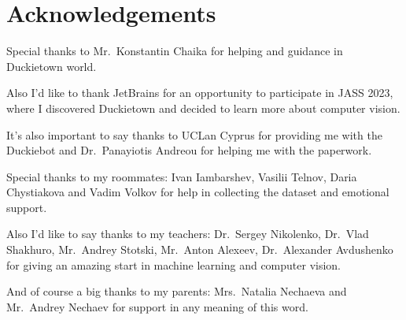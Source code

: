 \section*{Acknowledgements}
\setlength{\parskip}{10pt}
\noindent Special thanks to Mr.\ Konstantin Chaika for helping and guidance in Duckietown world.

\noindent Also I'd like to thank JetBrains for an opportunity to participate in JASS 2023, where I discovered Duckietown and decided to learn more about computer vision. 

\noindent It's also important to say thanks to UCLan Cyprus for providing me with the Duckiebot and Dr.\ Panayiotis Andreou for helping me with the paperwork.

\noindent Special thanks to my roommates: Ivan Iambarshev, Vasilii Telnov, Daria Chystiakova and Vadim Volkov for help in collecting the dataset and emotional support.

\noindent Also I'd like to say thanks to my teachers: Dr.\ Sergey Nikolenko, Dr.\ Vlad Shakhuro, Mr.\ Andrey Stotski, Mr.\ Anton Alexeev, Dr.\ Alexander Avdushenko
for giving an amazing start in machine learning and computer vision.

\noindent And of course a big thanks to my parents: Mrs.\ Natalia Nechaeva and Mr.\ Andrey Nechaev for support in any meaning of this word.
